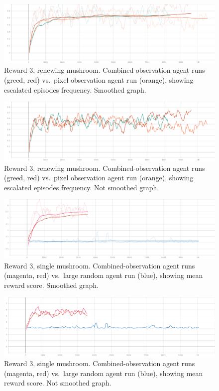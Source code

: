 \documentclass[]{article}
\begin{document}
\begin{figure}
\centering
\includegraphics{./img/114089128-12188a00-98b6-11eb-9f61-a544f493a2f0.png}
\caption{Reward 3, renewing mushroom. Combined-observation agent runs
(greed, red) vs.~pixel observation agent run (orange), showing escalated
episodes frequency. Smoothed graph.}
\end{figure}

\begin{figure}
\centering
\includegraphics{./img/114089168-1c3a8880-98b6-11eb-9420-669eec175369.png}
\caption{Reward 3, renewing mushroom. Combined-observation agent runs
(greed, red) vs.~pixel observation agent run (orange), showing escalated
episodes frequency. Not smoothed graph.}
\end{figure}

\begin{figure}
\centering
\includegraphics{./img/114090885-49883600-98b8-11eb-90cf-b0244b0fbc63.png}
\caption{Reward 3, single mushroom. Combined-observation agent runs
(magenta, red) vs.~large random agent run (blue), showing mean reward
score. Smoothed graph.}
\end{figure}

\begin{figure}
\centering
\includegraphics{./img/114090937-57d65200-98b8-11eb-8449-ed66b1f58fc3.png}
\caption{Reward 3, single mushroom. Combined-observation agent runs
(magenta, red) vs.~large random agent run (blue), showing mean reward
score. Not smoothed graph.}
\end{figure}
\end{document}

